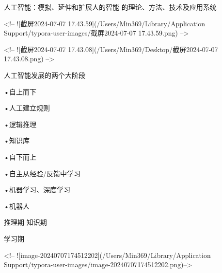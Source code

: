 人工智能：模拟、延伸和扩展人的智能   的理论、方法、技术及应用系统


<!-- ![截屏2024-07-07 17.43.59](/Users/Min369/Library/Application Support/typora-user-images/截屏2024-07-07 17.43.59.png) -->

<!-- ![截屏2024-07-07 17.43.08](/Users/Min369/Desktop/截屏2024-07-07 17.43.08.png)  -->



人工智能发展的两个大阶段

•自上而下

•人工建立规则

•逻辑推理

•知识库



•自下而上

•自主从经验/反馈中学习

•机器学习、深度学习

•机器人



推理期
知识期


学习期



<!-- ![image-20240707174512202](/Users/Min369/Library/Application Support/typora-user-images/image-20240707174512202.png)-->
